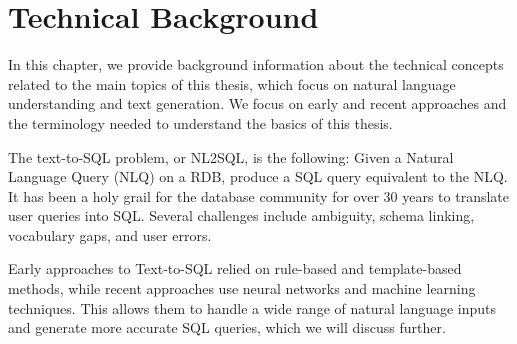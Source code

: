 \section{Technical Background}

In this chapter, we provide background information about the technical concepts related to the main topics of this thesis, which focus on natural language understanding and text generation. We focus on early and recent approaches and the terminology needed to understand the basics of this thesis.

The text-to-SQL problem, or \ac{NL2SQL}, is the following: Given a Natural Language Query (NLQ) on a \ac{RDB}, produce a SQL query equivalent to the \ac{NLQ}. It has been a holy grail for the database community for over 30 years to translate user queries into SQL. Several challenges include ambiguity, schema linking, vocabulary gaps, and user errors.

Early approaches to Text-to-SQL relied on rule-based and template-based methods, while recent approaches use neural networks and machine learning techniques. This allows them to handle a wide range of natural language inputs and generate more accurate SQL queries, which we will discuss further.






